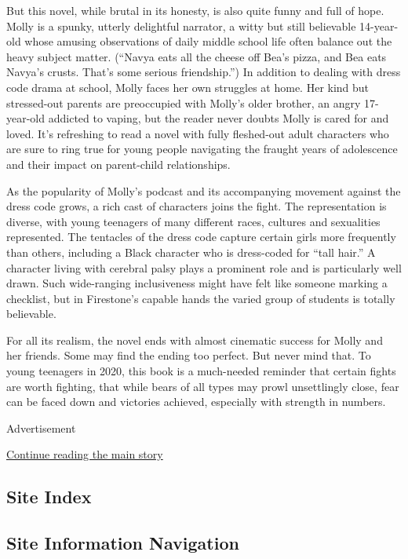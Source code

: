 But this novel, while brutal in its honesty, is also quite funny and
full of hope. Molly is a spunky, utterly delightful narrator, a witty
but still believable 14-year-old whose amusing observations of daily
middle school life often balance out the heavy subject matter. (``Navya
eats all the cheese off Bea's pizza, and Bea eats Navya's crusts. That's
some serious friendship.'') In addition to dealing with dress code drama
at school, Molly faces her own struggles at home. Her kind but
stressed-out parents are preoccupied with Molly's older brother, an
angry 17-year-old addicted to vaping, but the reader never doubts Molly
is cared for and loved. It's refreshing to read a novel with fully
fleshed-out adult characters who are sure to ring true for young people
navigating the fraught years of adolescence and their impact on
parent-child relationships.

As the popularity of Molly's podcast and its accompanying movement
against the dress code grows, a rich cast of characters joins the fight.
The representation is diverse, with young teenagers of many different
races, cultures and sexualities represented. The tentacles of the dress
code capture certain girls more frequently than others, including a
Black character who is dress-coded for ``tall hair.'' A character living
with cerebral palsy plays a prominent role and is particularly well
drawn. Such wide-ranging inclusiveness might have felt like someone
marking a checklist, but in Firestone's capable hands the varied group
of students is totally believable.

For all its realism, the novel ends with almost cinematic success for
Molly and her friends. Some may find the ending too perfect. But never
mind that. To young teenagers in 2020, this book is a much-needed
reminder that certain fights are worth fighting, that while bears of all
types may prowl unsettlingly close, fear can be faced down and victories
achieved, especially with strength in numbers.

Advertisement

\protect\hyperlink{after-bottom}{Continue reading the main story}

\hypertarget{site-index}{%
\subsection{Site Index}\label{site-index}}

\hypertarget{site-information-navigation}{%
\subsection{Site Information
Navigation}\label{site-information-navigation}}

